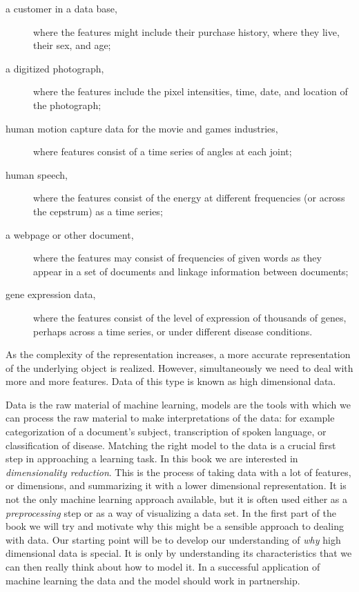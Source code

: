 \begin{description}
\item[a customer in a data base,] where the features might include
  their purchase history, where they live, their sex, and age;

\item[a digitized photograph,] where the features include the pixel
  intensities, time, date, and location of the photograph;

\item[human motion capture data for the movie and games industries,]
  where features consist of a time series of angles at each joint;

\item[human speech,] where the features consist of the energy at
  different frequencies (or across the cepstrum) as a time series;

\item[a webpage or other document,] where the features may consist of
  frequencies of given words as they appear in a set of documents and
  linkage information between documents;

\item[gene expression data,] where the features consist of the level
  of expression of thousands of genes, perhaps across a time series,
  or under different disease conditions.
\end{description}

As the complexity of the representation increases, a more accurate
representation of the underlying object is realized. However,
simultaneously we need to deal with more and more features. Data of
this type is known as high dimensional data.

Data is the raw material of machine learning, models are the tools
with which we can process the raw material to make interpretations of
the data: for example categorization of a document's subject,
transcription of spoken language, or classification of disease.
Matching the right model to the data is a crucial first step in
approaching a learning task. In this book we are interested in
\emph{dimensionality reduction}. This is the process of taking data
with a lot of features, or dimensions, and summarizing it with a lower
dimensional representation. It is not the only machine learning
approach available, but it is often used either as a
\emph{\gls{preprocessing}} step or as a way of visualizing a data set.
In the first part of the book we will try and motivate why this might
be a sensible approach to dealing with data. Our starting point will
be to develop our understanding of \emph{why} high dimensional data is
special.  It is only by understanding its characteristics that we can
then really think about how to model it. In a successful application
of machine learning the data and the model should work in partnership.

